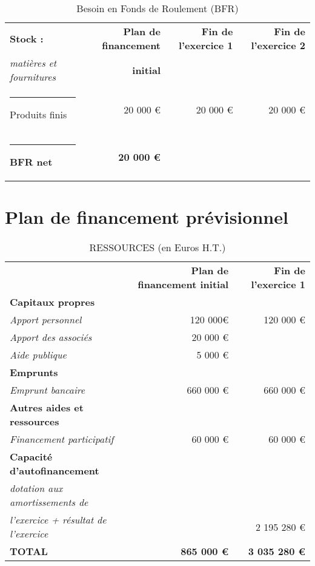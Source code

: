\documentclass[12pt,a4paper]{report}
\begin{document}
		\vspace{0.3cm}
		\begin{table}[h]
			\centering
			\caption{\color{green}Besoin en Fonds de Roulement (BFR)}
			\vspace{0.5cm}
			\begin{tabular}{l|r|r|r}
				
				\textbf{Stock :}& \textbf{Plan de financement} & \textbf{Fin de l'exercice 1} & \textbf{Fin de l'exercice 2}\\
				\textit{matières et fournitures} & \textbf{initial} & &  \\ \hline
				\rule[0.5cm]{-0.1cm}{0cm}
				Produits finis & 20 000 € & 20 000 € & 20 000 € \\
				\hline
				\rule[0.5cm]{-0.1cm}{0cm}
				\textbf{\color{green}BFR net} & \textbf{\color{green}20 000 €} & & \\
				
			\end{tabular}%
			\label{tab:addlabel}%
		\end{table}%
	\newpage
	\section{Plan de financement prévisionnel}
	\begin{table}[h]
		\centering
		\caption{\color{green}RESSOURCES (en Euros H.T.)}
		\vspace{0.5cm}
		\begin{tabular}{l|r|r}
			
			
			& \textbf{Plan de financement initial} &\textbf{Fin de l'exercice 1} \\
			\textbf{Capitaux propres} & & \\					
			\textit{Apport personnel} & 120 000€ &	120 000 €	 \\
			\textit{Apport des associés} & 20 000 € & \\		
			\textit{Aide publique} &	5 000 € &  \\	
			\textbf{Emprunts}	& &  \\					
			\textit{Emprunt bancaire} & 	660 000 € &	660 000	€  \\
			\textbf{Autres aides et ressources} & &  \\
			\textit{Financement participatif} & 60 000 €& 60 000	€  \\					
			\textbf{Capacité d'autofinancement}	& &  \\					
			\textit{ dotation aux amortissements de}	& & \\					
			\textit{l'exercice + résultat de l'exercice}	&  & 2 195 280 €  \\					
			
			\textbf{\color{green}TOTAL} & \textbf{\color{green}865 000 €} &	\textbf{\color{green}3 035 280 €}  \\	
			
		\end{tabular}%
		\label{tab:addlabel}%
	\end{table}%
	
\end{document}
